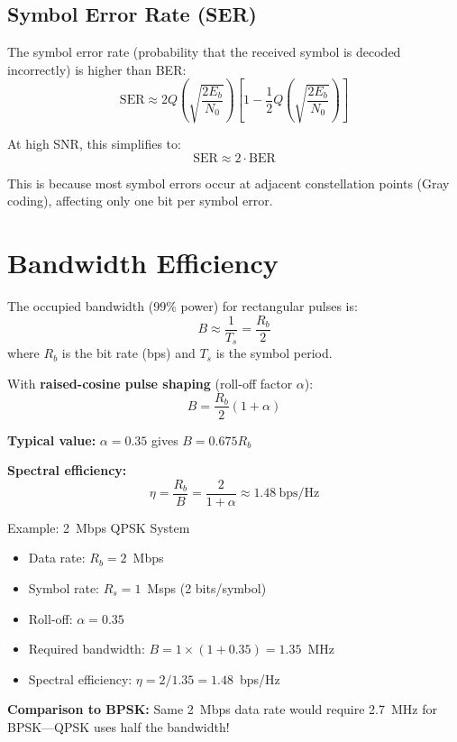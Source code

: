 \subsection{Symbol Error Rate (SER)}

The symbol error rate (probability that the received symbol is decoded incorrectly) is higher than BER:
\begin{equation}
\mathrm{SER} \approx 2Q\left(\sqrt{\frac{2E_b}{N_0}}\right) \left[1 - \frac{1}{2}Q\left(\sqrt{\frac{2E_b}{N_0}}\right)\right]
\end{equation}

At high SNR, this simplifies to:
\begin{equation}
\mathrm{SER} \approx 2 \cdot \mathrm{BER}
\end{equation}

This is because most symbol errors occur at adjacent constellation points (Gray coding), affecting only one bit per symbol error.

\section{Bandwidth Efficiency}

The occupied bandwidth (99\% power) for rectangular pulses is:
\begin{equation}
B \approx \frac{1}{T_s} = \frac{R_b}{2}
\end{equation}
where $R_b$ is the bit rate (bps) and $T_s$ is the symbol period.

With \textbf{raised-cosine pulse shaping} (roll-off factor $\alpha$):
\begin{equation}
B = \frac{R_b}{2}(1 + \alpha)
\end{equation}

\textbf{Typical value:} $\alpha = 0.35$ gives $B = 0.675 R_b$

\textbf{Spectral efficiency:}
\begin{equation}
\eta = \frac{R_b}{B} = \frac{2}{1+\alpha} \approx 1.48\ \text{bps/Hz}
\end{equation}

\begin{calloutbox}{Example: 2~Mbps QPSK System}
\begin{itemize}
\item Data rate: $R_b = 2$~Mbps
\item Symbol rate: $R_s = 1$~Msps (2 bits/symbol)
\item Roll-off: $\alpha = 0.35$
\item Required bandwidth: $B = 1 \times (1 + 0.35) = 1.35$~MHz
\item Spectral efficiency: $\eta = 2/1.35 = 1.48$~bps/Hz
\end{itemize}

\textbf{Comparison to BPSK:} Same 2~Mbps data rate would require 2.7~MHz for BPSK---QPSK uses half the bandwidth!
\end{calloutbox}

